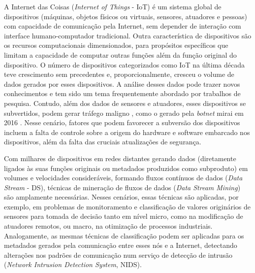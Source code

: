 A Internet das Coisas (\emph{Internet of Things} - IoT) é um sistema global de
dispositivos (máquinas, objetos físicos ou virtuais, sensores, atuadores e
pessoas) com capacidade de comunicação pela Internet, sem depender de
interação com interface humano-computador tradicional.
Outra característica de dispositivos \iot são os 
recursos computacionais dimensionados,
para
propósitos específicos que limitam a capacidade de computar outras funções além
da função original do dispositivo.
O número de dispositivos categorizados como IoT na última década teve
crescimento sem precedentes e, proporcionalmente, cresceu o volume de dados
gerados por esses dispositivos.
A análise desses dados pode trazer novos conhecimentos e tem sido um tema frequentemente
abordado por trabalhos de pesquisa.
Contudo, além dos dados de sensores e atuadores, esses dispositivos se subvertidos,
podem gerar tráfego maligno
, como o gerado pela
\emph{botnet} mirai em 2016 \cite{Kambourakis2017}.
Nesse cenário, fatores que podem favorecer a subversão dos dispositivos incluem a
falta de controle sobre a origem do hardware e software embarcado nos
dispositivos, além da falta das cruciais atualizações de segurança.


\newcommand{\ds}{DS\xspace}

Com milhares de dispositivos em redes distantes gerando dados (diretamente
ligados às suas funções originais ou metadados produzidos como subproduto) em
volumes e velocidades consideráveis, formando fluxos contínuos de dados (\emph{Data
Stream} - DS), técnicas de mineração de fluxos de dados
(\emph{Data Stream Mining}) são amplamente necessárias.
Nesses cenários, essas técnicas são
aplicadas, por exemplo, em problemas de monitoramento e classificação de valores
originários de sensores para tomada de decisão tanto em nível micro, como na
modificação de atuadores remotos, ou macro, na otimização de processos
industriais.
Analogamente, as mesmas técnicas de classificação podem ser aplicadas para os
metadados gerados pela comunicação entre esses nós e a Internet, detectando
alterações nos padrões de comunicação num serviço de detecção de intrusão
(\emph{Network Intrusion Detection System}, NIDS).

